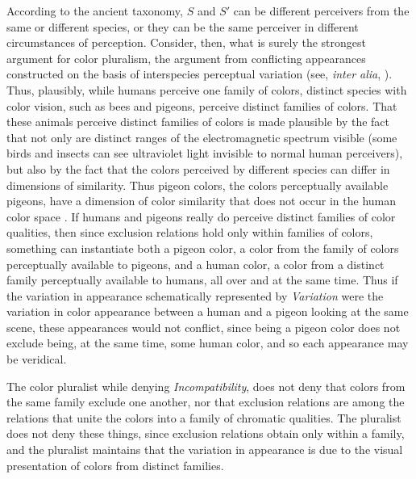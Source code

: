 \documentclass[12pt]{article}
\begin{document}
According to the ancient taxonomy, \( S \) and \( S' \) can be different perceivers from the same or different species, or they can be the same perceiver in different circumstances of perception. Consider, then, what is surely the strongest argument for color pluralism, the argument from conflicting appearances constructed on the basis of interspecies perceptual variation (see, \emph{inter alia}, \citealt{Bradley:2001mi,Byrne:2003we,Mizrahi:2006zr,Allen:2005be,Kalderon:2006tg}). Thus, plausibly, while humans perceive one family of colors, distinct species with color vision, such as bees and pigeons, perceive distinct families of colors. That these animals perceive distinct families of colors is made plausible by the fact that not only are distinct ranges of the electromagnetic spectrum visible (some birds and insects can see ultraviolet light invisible to normal human perceivers), but also by the fact that the colors perceived by different species can differ in dimensions of similarity. Thus pigeon colors, the colors perceptually available pigeons, have a dimension of color similarity that does not occur in the human color space \citep{Bradley:2001mi,Allen:2005be}. If humans and pigeons really do perceive distinct families of color qualities, then since exclusion relations hold only within families of colors, something can instantiate both a pigeon color, a color from the family of colors perceptually available to pigeons, and a human color, a color from a distinct family perceptually available to humans, all over and at the same time. Thus if the variation in appearance schematically represented by \emph{Variation} were the variation in color appearance between a human and a pigeon looking at the same scene, these appearances would not conflict, since being a pigeon color does not exclude being, at the same time, some human color, and so each appearance may be veridical.

The color pluralist while denying \emph{Incompatibility}, does not deny that colors from the same family exclude one another, nor that exclusion relations are among the relations that unite the colors into a family of chromatic qualities. The pluralist does not deny these things, since exclusion relations obtain only within a family, and the pluralist maintains that the variation in appearance is due to the visual presentation of colors from distinct families.
\end{document}
